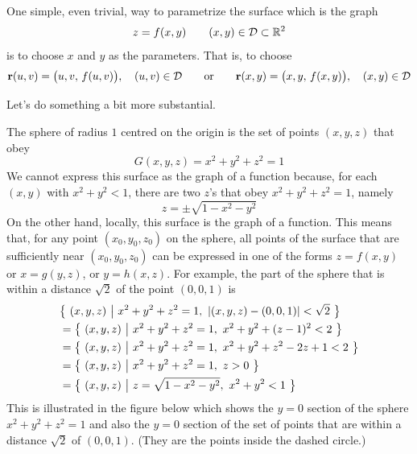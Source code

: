 \begin{eg}\label{SUR:paramGraph}
One simple, even trivial, way to parametrize the surface which is the graph
\begin{equation*}
 z = f(x,y)\qquad (x,y)\in\mathcal{D}\subset\mathbb{R}^2
\end{equation*} 
is to choose $x$ and $y$ as the parameters. That is, to choose
\begin{equation*}
\mathbf{r}(u,v) = \big(u,v,\,f(u,v)\big),\quad (u,v)\in\mathcal{D}\qquad\text{or}\qquad
\mathbf{r}(x,y) = \big(x,y,\,f(x,y)\big),\quad (x,y)\in\mathcal{D}
\end{equation*}

\end{eg}
Let's do something a bit more substantial.

\begin{eg}[Sphere]\label{eg:SURsphere}
The sphere of radius $1$ centred on the origin is the set of 
points $(x,y,z)$ that obey
\begin{equation*}
G(x,y,z)= x^2+y^2+z^2=1
\end{equation*}
We cannot express this surface as the graph of a function because,
for each $(x,y)$ with $x^2+y^2<1$, there are two $z$'s that obey
$x^2+y^2+z^2=1$, namely
\begin{equation*}
z=\pm\sqrt{1-x^2-y^2}
\end{equation*}
On the other hand, locally, this surface is the graph of a function.
This means that, for any point $(x_0, y_0, z_0)$ on the sphere, all
points of the surface that are sufficiently near $(x_0, y_0, z_0)$
can be expressed in one of the forms $z=f(x,y)$ or $x=g(y,z)$, 
or $y=h(x,z)$. For example, the part of the sphere that is within a distance
$\sqrt{2}$ of the point $(0,0,1)$ is
\begin{align*}
&\big\{ \ (x,y,z)\ \big|\  x^2+y^2+z^2=1,\ |(x,y,z) - (0,0,1)|<\sqrt{2}\ \big\} \\
&=\big\{ \ (x,y,z)\ \big|\  x^2+y^2+z^2=1,\ x^2+y^2+(z-1)^2 < 2\ \big\} \\
&=\big\{ \ (x,y,z)\ \big|\  x^2+y^2+z^2=1,\ x^2+y^2+z^2-2z+1 < 2\ \big\} \\
&=\big\{ \ (x,y,z)\ \big|\  x^2+y^2+z^2=1,\ z>0\ \big\} \\
&=\big\{ \ (x,y,z)\ \big|\  z=\sqrt{1-x^2-y^2},\ x^2+y^2<1\ \big\}
\end{align*}
This is illustrated in the figure below which shows the $y=0$ section
of the sphere $x^2+y^2+z^2=1$ and also the $y=0$ section of the set of
points that are within a distance $\sqrt{2}$ of $(0,0,1)$. (They are
the points inside the dashed circle.) 
\begin{efig}

\end{efig}
\end{eg}
